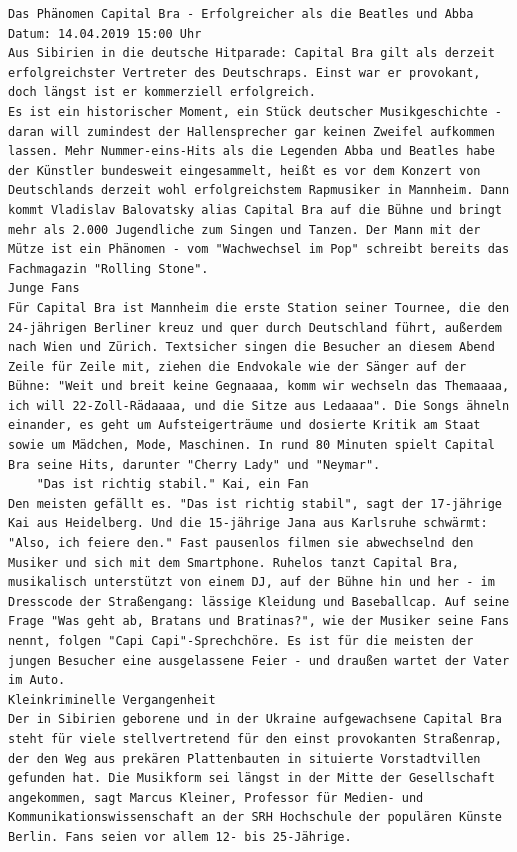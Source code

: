 \documentclass[
  letterpaper,
]{scrbook}
\begin{document}
\begin{verbatim}
Das Phänomen Capital Bra - Erfolgreicher als die Beatles und Abba
Datum: 14.04.2019 15:00 Uhr
Aus Sibirien in die deutsche Hitparade: Capital Bra gilt als derzeit erfolgreichster Vertreter des Deutschraps. Einst war er provokant, doch längst ist er kommerziell erfolgreich.
Es ist ein historischer Moment, ein Stück deutscher Musikgeschichte - daran will zumindest der Hallensprecher gar keinen Zweifel aufkommen lassen. Mehr Nummer-eins-Hits als die Legenden Abba und Beatles habe der Künstler bundesweit eingesammelt, heißt es vor dem Konzert von Deutschlands derzeit wohl erfolgreichstem Rapmusiker in Mannheim. Dann kommt Vladislav Balovatsky alias Capital Bra auf die Bühne und bringt mehr als 2.000 Jugendliche zum Singen und Tanzen. Der Mann mit der Mütze ist ein Phänomen - vom "Wachwechsel im Pop" schreibt bereits das Fachmagazin "Rolling Stone".
Junge Fans
Für Capital Bra ist Mannheim die erste Station seiner Tournee, die den 24-jährigen Berliner kreuz und quer durch Deutschland führt, außerdem nach Wien und Zürich. Textsicher singen die Besucher an diesem Abend Zeile für Zeile mit, ziehen die Endvokale wie der Sänger auf der Bühne: "Weit und breit keine Gegnaaaa, komm wir wechseln das Themaaaa, ich will 22-Zoll-Rädaaaa, und die Sitze aus Ledaaaa". Die Songs ähneln einander, es geht um Aufsteigerträume und dosierte Kritik am Staat sowie um Mädchen, Mode, Maschinen. In rund 80 Minuten spielt Capital Bra seine Hits, darunter "Cherry Lady" und "Neymar".
    "Das ist richtig stabil." Kai, ein Fan
Den meisten gefällt es. "Das ist richtig stabil", sagt der 17-jährige Kai aus Heidelberg. Und die 15-jährige Jana aus Karlsruhe schwärmt: "Also, ich feiere den." Fast pausenlos filmen sie abwechselnd den Musiker und sich mit dem Smartphone. Ruhelos tanzt Capital Bra, musikalisch unterstützt von einem DJ, auf der Bühne hin und her - im Dresscode der Straßengang: lässige Kleidung und Baseballcap. Auf seine Frage "Was geht ab, Bratans und Bratinas?", wie der Musiker seine Fans nennt, folgen "Capi Capi"-Sprechchöre. Es ist für die meisten der jungen Besucher eine ausgelassene Feier - und draußen wartet der Vater im Auto.
Kleinkriminelle Vergangenheit
Der in Sibirien geborene und in der Ukraine aufgewachsene Capital Bra steht für viele stellvertretend für den einst provokanten Straßenrap, der den Weg aus prekären Plattenbauten in situierte Vorstadtvillen gefunden hat. Die Musikform sei längst in der Mitte der Gesellschaft angekommen, sagt Marcus Kleiner, Professor für Medien- und Kommunikationswissenschaft an der SRH Hochschule der populären Künste Berlin. Fans seien vor allem 12- bis 25-Jährige.

\end{verbatim}
\end{document}
